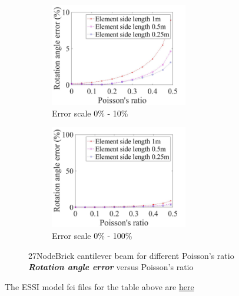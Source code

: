 \documentclass[fleqn,11pt]{article}
\begin{document}
\begin{figure}[H]
  \begin{subfigure}{0.5\textwidth}
    \centering
    \includegraphics[width=6cm]{../Figure-files/error27brick_beam_different_poisson_ratio_angle_div.jpeg}
    \caption{Error scale 0\% - 10\%}
  \end{subfigure}
  \begin{subfigure}{0.5\textwidth}
    \centering
    \includegraphics[width=6cm]{../Figure-files/error27brick_beam_different_poisson_ratio_angle_div100.jpeg}
    \caption{Error scale 0\% - 100\%}
  \end{subfigure}
  \captionsetup{justification=centering,margin=3cm}
  \caption{27NodeBrick cantilever beam for different Poisson's ratio\\
      \textbf{\emph{Rotation angle error} }  versus   Poisson's ratio}
  \label{table angle error 27NodeBrick cantilever beam for different Poisson ratio}
\end{figure}




The ESSI model fei files for the table above are \href{https://github.com/yuan-energy/ESSI_Verification/blob/master/27NodeBrick/cantilever_different_Poisson/cantilever_different_Poisson.tar.gz?raw=true}{here}
\end{document}
